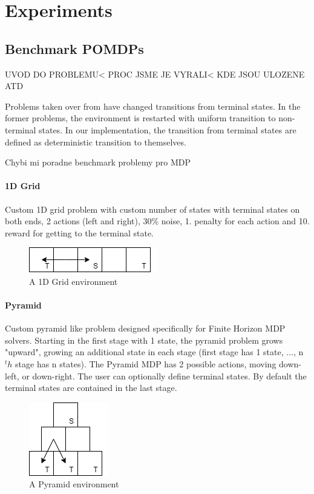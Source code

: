 \part{Experiments}

\chapter{Benchmark POMDPs}

UVOD DO PROBLEMU< PROC JSME JE VYRALI< KDE JSOU ULOZENE ATD

Problems taken over from \cite{Littman} have changed transitions from terminal states. In the former problems, the environment is restarted with uniform transition to non-terminal states. In our implementation, the transition from terminal states are defined as deterministic transition to themselves. 


Chybi mi poradne benchmark problemy pro MDP

\subsection{1D Grid}
Custom 1D grid problem with custom number of states with terminal states on both ends, 2 actions (left and right), 30\% noise, 1. penalty for each action and 10. reward for getting to the terminal state.

\begin{figure}[h]
\caption{A 1D Grid environment}
\centering
\includegraphics[scale=0.5]{1D_grid.png}
\end{figure}

\subsection{Pyramid}
Custom pyramid like problem designed specifically for Finite Horizon MDP solvers. Starting in the first stage with 1 state, the pyramid problem grows "upward", growing an additional state in each stage (first stage has 1 state, ..., n$^th$ stage has n states). The Pyramid MDP has 2 possible actions, moving down-left, or down-right. The user can optionally define terminal states. By default the terminal states are contained in the last stage.

\begin{figure}[h]
\caption{A Pyramid environment}
\centering
\includegraphics[scale=0.5]{Pyramid.png}
\end{figure}

